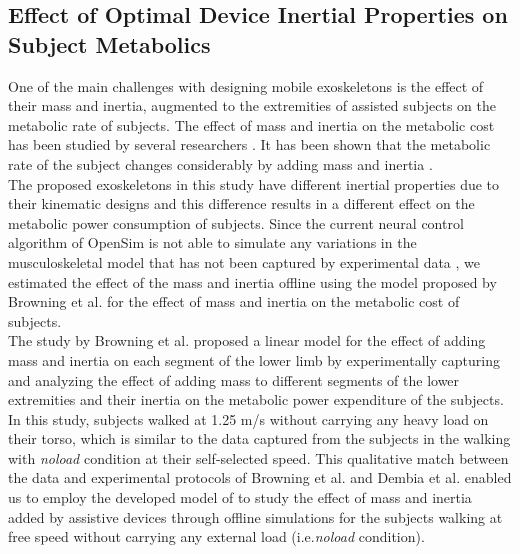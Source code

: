\documentclass[10pt,letterpaper]{article}
\begin{document}
\subsection*{Effect of Optimal Device Inertial Properties on Subject Metabolics}
One of the main challenges with designing mobile exoskeletons is the effect of their mass and inertia, augmented to the extremities of assisted subjects on the metabolic rate of subjects. The effect of mass and inertia on the metabolic cost has been studied by several researchers \cite{133,134}. It has been shown that the metabolic rate of the subject changes considerably by adding mass and inertia \cite{133,134,135}.\\
The proposed exoskeletons in this study have different inertial properties due to their kinematic designs and this difference results in a different effect on the metabolic power consumption of subjects. Since the current neural control algorithm of OpenSim is not able to simulate any variations in the musculoskeletal model that has not been captured by experimental data \cite{92}, we estimated the effect of the mass and inertia offline using the model proposed by Browning et al.\cite{133} for the effect of mass and inertia on the metabolic cost of subjects.\\
The study by Browning et al.\cite{133} proposed a linear model for the effect of adding mass and inertia on each segment of the lower limb by experimentally capturing and analyzing the effect of adding mass to different segments of the lower extremities and their inertia on the metabolic power expenditure of the subjects. In this study, subjects walked at 1.25 m/s without carrying any heavy load on their torso, which is similar to the data captured from the subjects in the walking with \textit{noload} condition at their self-selected speed\cite{93}. This qualitative match between the data and experimental protocols of Browning et al. and Dembia et al. enabled us to employ the developed model of \cite{133} to study the effect of mass and inertia added by assistive devices through offline simulations for the subjects walking at free speed without carrying any external load (i.e.{\it noload} condition).\\
\end{document}
